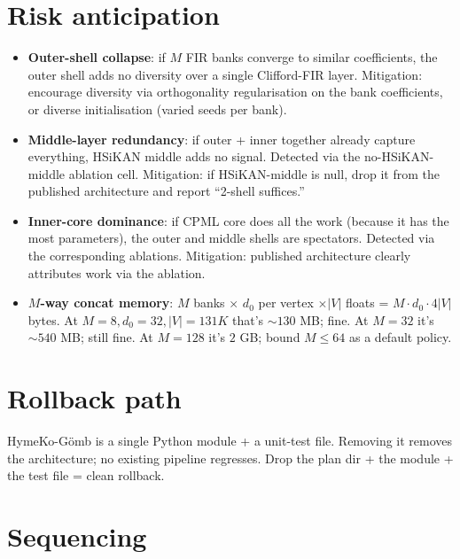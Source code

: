 \documentclass[11pt]{article}
\begin{document}
\section{Risk anticipation}

\begin{itemize}
  \item \textbf{Outer-shell collapse}: if $M$ FIR banks converge to
    similar coefficients, the outer shell adds no diversity over
    a single Clifford-FIR layer. Mitigation: encourage diversity
    via orthogonality regularisation on the bank coefficients, or
    diverse initialisation (varied seeds per bank).
  \item \textbf{Middle-layer redundancy}: if outer + inner together
    already capture everything, HSiKAN middle adds no signal.
    Detected via the no-HSiKAN-middle ablation cell. Mitigation:
    if HSiKAN-middle is null, drop it from the published architecture
    and report ``2-shell suffices.''
  \item \textbf{Inner-core dominance}: if CPML core does all the
    work (because it has the most parameters), the outer and middle
    shells are spectators. Detected via the corresponding
    ablations. Mitigation: published architecture clearly attributes
    work via the ablation.
  \item \textbf{$M$-way concat memory}: $M$ banks $\times$ $d_0$ per
    vertex $\times |V|$ floats = $M \cdot d_0 \cdot 4 |V|$ bytes.
    At $M=8, d_0=32, |V|=131K$ that's $\sim 130$ MB; fine. At
    $M=32$ it's $\sim 540$ MB; still fine. At $M=128$ it's $2$ GB;
    bound $M \le 64$ as a default policy.
\end{itemize}

\section{Rollback path}

HymeKo-Gömb is a single Python module + a unit-test file. Removing it
removes the architecture; no existing pipeline regresses. Drop the
plan dir + the module + the test file = clean rollback.

\section{Sequencing}
\end{document}
